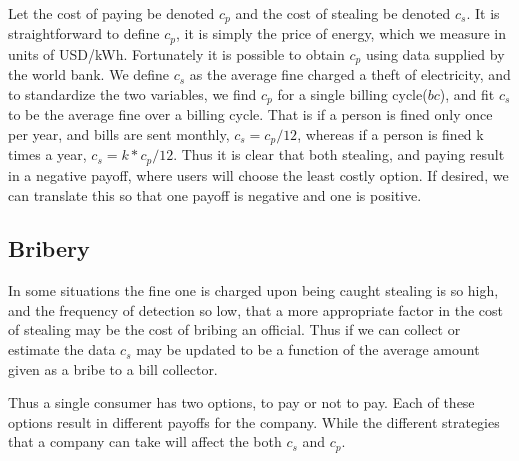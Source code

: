 \documentclass{article}
\begin{document}
Let the cost of paying be denoted $c_p$ and the cost of stealing be denoted $c_s$. It is straightforward to define $c_p$, it is simply the price of energy, which we measure in units of USD/kWh. Fortunately it is possible to obtain $c_p$ using data supplied by the world bank. We define $c_s$ as the average fine charged a theft of electricity, and to standardize the two variables, we find $c_p$ for a single billing cycle($bc$), and fit $c_s$ to be the average fine over a billing cycle. That is if a person is fined only once per year, and bills are sent monthly, $c_s = c_p/12$, whereas if a person is fined k times a year, $c_s = k*c_p/12$. Thus it is clear that both stealing, and paying result in a negative payoff, where users will choose the least costly option. If desired, we can translate this so that one payoff is negative and one is positive. \\


\subsection{Bribery}
In some situations the fine one is charged upon being caught stealing is so high, and the frequency of detection so low, that a more appropriate factor in the cost of stealing may be the cost of bribing an official. Thus if we can collect or estimate the data $c_s$ may be updated to be a function of the average amount given as a bribe to a bill collector. 

Thus a single consumer has two options, to pay or not to pay. Each of these options result in different payoffs for the company. While the different strategies that a company can take will affect the both $c_s$ and $c_p$. 
\end{document}
